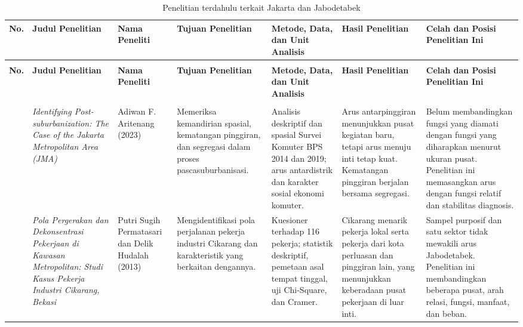 \documentclass[11pt,a4paper,oneside,openany,indonesian]{report}
\begin{document}
\clearpage
\begin{landscape}
\scriptsize
\setlength{\tabcolsep}{2.2pt}
\renewcommand{\arraystretch}{1.18}
\begin{longtable}{>{\centering\arraybackslash}p{0.55cm}p{3.4cm}p{3.0cm}p{3.6cm}p{3.9cm}p{4.0cm}p{4.5cm}}
\caption{Penelitian terdahulu terkait Jakarta dan Jabodetabek}\label{tab:penelitian-terdahulu}\\
\toprule
\textbf{No.} & \textbf{Judul Penelitian} & \textbf{Nama Peneliti} & \textbf{Tujuan Penelitian} & \textbf{Metode, Data, dan Unit Analisis} & \textbf{Hasil Penelitian} & \textbf{Celah dan Posisi Penelitian Ini}\\
\midrule
\endfirsthead
\multicolumn{7}{l}{\textit{Lanjutan Tabel \thetable}}\\
\toprule
\textbf{No.} & \textbf{Judul Penelitian} & \textbf{Nama Peneliti} & \textbf{Tujuan Penelitian} & \textbf{Metode, Data, dan Unit Analisis} & \textbf{Hasil Penelitian} & \textbf{Celah dan Posisi Penelitian Ini}\\
\midrule
\endhead
\midrule
\multicolumn{7}{r}{\textit{Bersambung ke halaman berikutnya}}\\
\endfoot
\bottomrule
\endlastfoot
1 & \textit{Identifying Post-suburbanization: The Case of the Jakarta Metropolitan Area (JMA)} & Adiwan F. Aritenang (2023) & Memeriksa kemandirian spasial, kematangan pinggiran, dan segregasi dalam proses pascasuburbanisasi. & Analisis deskriptif dan spasial Survei Komuter BPS 2014 dan 2019; arus antardistrik dan karakter sosial ekonomi komuter. & Arus antarpinggiran menunjukkan pusat kegiatan baru, tetapi arus menuju inti tetap kuat. Kematangan pinggiran berjalan bersama segregasi. & Belum membandingkan fungsi yang diamati dengan fungsi yang diharapkan menurut ukuran pusat. Penelitian ini memasangkan arus dengan fungsi relatif dan stabilitas diagnosis.\\
2 & \textit{Pola Pergerakan dan Dekonsentrasi Pekerjaan di Kawasan Metropolitan: Studi Kasus Pekerja Industri Cikarang, Bekasi} & Putri Sugih Permatasari dan Delik Hudalah (2013) & Mengidentifikasi pola perjalanan pekerja industri Cikarang dan karakteristik yang berkaitan dengannya. & Kuesioner terhadap 116 pekerja; statistik deskriptif, pemetaan asal tempat tinggal, uji Chi-Square, dan Cramer. & Cikarang menarik pekerja lokal serta pekerja dari kota perluasan dan pinggiran lain, yang menunjukkan keberadaan pusat pekerjaan di luar inti. & Sampel purposif dan satu sektor tidak mewakili arus Jabodetabek. Penelitian ini membandingkan beberapa pusat, arah relasi, fungsi, manfaat, dan beban.\\

\end{longtable}
\end{landscape}
\end{document}
